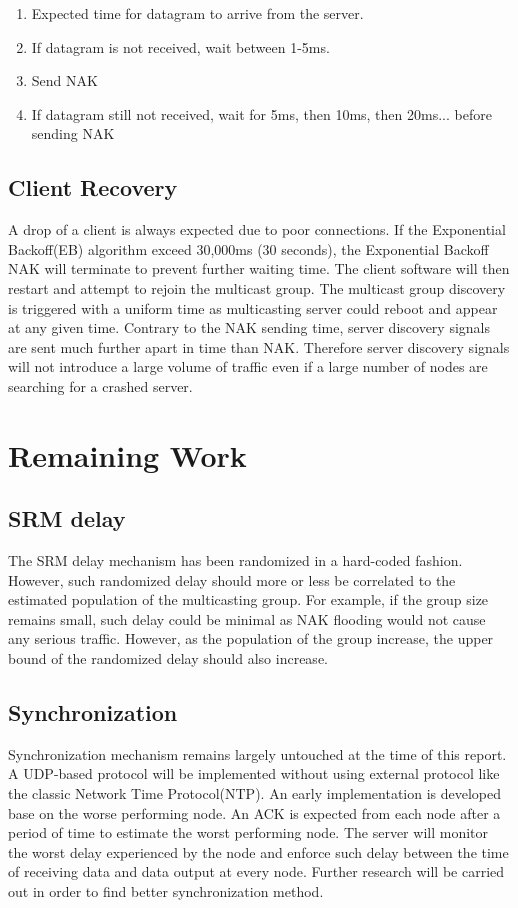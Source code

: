 \documentclass[12pt]{article}
\begin{document}
\begin{enumerate}
  \item Expected time for datagram to arrive from the server.
  \item If datagram is not received, wait between 1-5ms.
  \item Send NAK
  \item If datagram still not received, wait for 5ms, then 10ms, then 20ms... before sending NAK
\end{enumerate}

\subsection{Client Recovery}
A drop of a client is always expected due to poor connections. If the Exponential Backoff(EB) algorithm exceed 30,000ms (30 seconds), the Exponential Backoff NAK will terminate to prevent further waiting time. The client software will then restart and attempt to rejoin the multicast group. The multicast group discovery is triggered with a uniform time as multicasting server could reboot and appear at any given time. Contrary to the NAK sending time, server discovery signals are sent much further apart in time than NAK. Therefore server discovery signals will not introduce a large volume of traffic even if a large number of nodes are searching for a crashed server. 


\section{Remaining Work}

\subsection{SRM delay}
The SRM delay mechanism has been randomized in a hard-coded fashion. However, such randomized delay should more or less be correlated to the estimated population of the multicasting group. For example, if the group size remains small, such delay could be minimal as NAK flooding would not cause any serious traffic. However, as the population of the group increase, the upper bound of the randomized delay should also increase.


\subsection{Synchronization}
Synchronization mechanism remains largely untouched at the time of this report. A UDP-based protocol will be implemented without using external protocol like the classic Network Time Protocol(NTP). An early implementation is developed base on the worse performing node. An ACK is expected from each node after a period of time to estimate the worst performing node. The server will monitor the worst delay experienced by the node and enforce such delay between the time of receiving data and data output at every node. Further research will be carried out in order to find better synchronization method.
\end{document}
